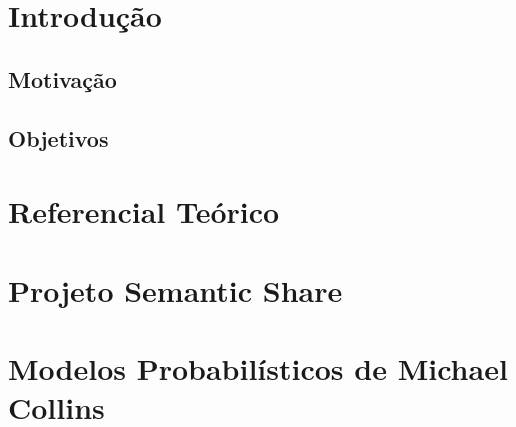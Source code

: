 \documentclass[a4paper]{abnt}
\begin{document}


\pagestyle{plain}
\tableofcontents
\listoffigures
\listoftables















\setcounter{page}{1}

\chapter{Introdução}
\label{cha:introducao}
    

\section{Motivação}
\label{cha:motivacao}
	

\section{Objetivos}
\label{cha:objetivos}
	

\chapter{Referencial Teórico}
\label{cha:referencial_teorico}
	

\chapter{Projeto Semantic Share}
\label{cha:proj_semantic}
	

\chapter{Modelos Probabilísticos de Michael Collins}
\label{cha:michael_collins}
	
\end{document}
